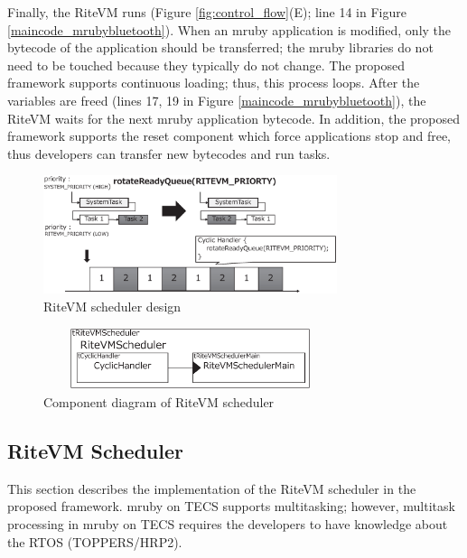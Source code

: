 \documentclass[conference]{IEEEtran/IEEEtran/IEEEtran}
\begin{document}
Finally, the RiteVM runs (Figure \ref{fig:control_flow}(E); line 14 in Figure \ref{maincode_mrubybluetooth}).
When an mruby application is modified, only the bytecode of the application should be transferred; the mruby libraries do not need to be touched because they typically do not change.
The proposed framework supports continuous loading; thus, this process loops.
After the variables are freed (lines 17, 19 in Figure \ref{maincode_mrubybluetooth}), the RiteVM waits for the next mruby application bytecode.
In addition, the proposed framework supports the reset component which force applications stop and free, thus developers can transfer new bytecodes and run tasks.

\begin{figure}[t]
    \centering
    \includegraphics[width=8.6cm,clip]{figure/rotateReadyQueue.eps}
    \vspace{-3mm}
\caption{RiteVM scheduler design}
    \vspace{-3mm}
\label{fig:rotateReadyQueue}
\end{figure} 

\begin{figure}[t]
    \centering
    \includegraphics[height=1.8cm,width=8.6cm,clip]{figure/cyclic_handler.eps}
    \vspace{-3mm}
\caption{Component diagram of RiteVM scheduler}
    \vspace{-3mm}
\label{fig:cyclic_handler}
\end{figure}

\subsection{RiteVM Scheduler}
\label{sec:RiteVM Scheduler}
This section describes the implementation of the RiteVM scheduler in the proposed framework.
mruby on TECS supports multitasking; however, multitask processing in mruby on TECS requires the developers to have knowledge about the RTOS (TOPPERS/HRP2).
\end{document}
